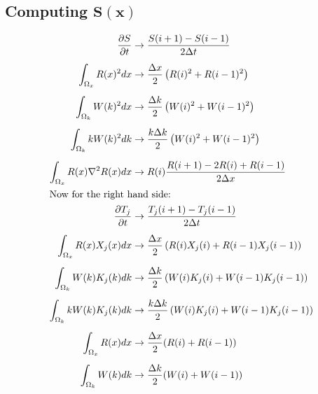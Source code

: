 \documentclass{article}
\def\ds{\displaystyle}
\def\pd{\partial}
\def\grad{\mathbf\nabla}
\begin{document}
\subsection{Computing $\mathbf{S(x)}$}
\begin{subequations}
\begin{align}
\frac{\pd S}{\pd t} &\to \frac{S(i+1) - S(i-1)}{2\Delta t} \\[5pt]
\ds\int_{\Omega_x} R(x)^2 dx &\to \frac{\Delta x}{2} \left( R(i)^2 + R(i-1)^2 \right) \\[5pt]
\ds\int_{\Omega_k} W(k)^2 dx &\to \frac{\Delta k}{2} \left( W(i)^2 + W(i-1)^2 \right) \\[5pt]
\ds\int_{\Omega_k} kW(k)^2 dk &\to \frac{k \Delta k}{2}\left( W(i)^2 + W(i-1)^2 \right) \\[5pt]
\ds\int_{\Omega_x} R(x)\grad^2 R(x) dx &\to R(i) \frac{R(i+1)-2R(i)+R(i-1)}{2\Delta x} \\
\intertext{Now for the right hand side:} 
\frac{\pd T_j}{\pd t} &\to \frac{T_j(i+1)-T_j(i-1)}{2\Delta t} \\[5pt] 
\ds\int_{\Omega_x} R(x) X_j(x) dx &\to \frac{\Delta x}{2} \left( R(i)X_j(i) + R(i-1)X_j(i-1) \right) \\[5pt]
\ds\int_{\Omega_k} W(k)K_j(k)dk &\to \frac{\Delta k}{2} \left( W(i)K_j(i) + W(i-1)K_j(i-1) \right) \\[5pt]
\ds\int_{\Omega_k} kW(k)K_j(k) dk &\to \frac{k\Delta k}{2} \left( W(i)K_j(i) + W(i-1)K_j(i-1) \right) \\[5pt]
\ds\int_{\Omega_x} R(x) dx &\to \frac{\Delta x}{2} (R(i) + R(i-1)) \\[5pt]
\ds\int_{\Omega_k} W(k) dk &\to \frac{\Delta k}{2} (W(i) + W(i-1)) 
\end{align}
\end{subequations}

%
\end{document}
